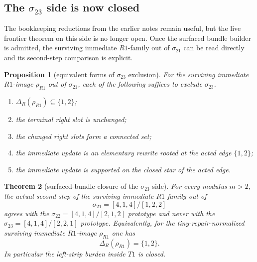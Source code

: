 \documentclass[11pt]{article}
\newtheorem{theorem}{Theorem}[section]
\newtheorem{proposition}[theorem]{Proposition}
\newcommand{\sig}[2]{\sigma_{#1#2}}
\newcommand{\RhoR}{\rho_{R1}}
\begin{document}
\subsection{The \texorpdfstring{$\sig23$}{sigma23} side is now closed}

The bookkeeping reductions from the earlier notes remain useful, but the live
frontier theorem on this side is no longer open.  Once the surfaced bundle
builder is admitted, the surviving immediate \(R1\)-family out of \(\sig21\)
can be read directly and its second-step comparison is explicit.

\begin{proposition}[equivalent forms of \(\sig23\) exclusion]
\label{prop:sigma23-equivalences}
For the surviving immediate \(R1\)-image \(\RhoR\) out of \(\sig21\), each of the
following suffices to exclude \(\sig23\).
\begin{enumerate}[label=\textup{(\arabic*)},leftmargin=2.8em]
\item \(\Delta_R(\RhoR)\subseteq\{1,2\}\);
\item the terminal right slot is unchanged;
\item the changed right slots form a connected set;
\item the immediate update is an elementary rewrite rooted at the acted edge
      \(\{1,2\}\);
\item the immediate update is supported on the closed star of the acted edge.
\end{enumerate}
\end{proposition}

\begin{theorem}[surfaced-bundle closure of the \(\sig23\) side]
\label{thm:sigma23-closed}
For every modulus \(m>2\), the actual second step of the surviving immediate
\(R1\)-family out of
\[
\sig21=[4,1,4]/[1,2,2]
\]
agrees with the \(\sig22=[4,1,4]/[2,1,2]\) prototype and never with the
\(\sig23=[4,1,4]/[2,2,1]\) prototype.
Equivalently, for the tiny-repair-normalized surviving immediate \(R1\)-image
\(\RhoR\) one has
\[
\Delta_R(\RhoR)=\{1,2\}.
\]
In particular the left-strip burden inside \(T1\) is closed.
\end{theorem}
\end{document}
